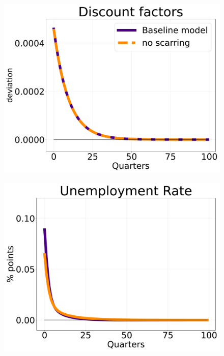 \begin{figure}[!h]
    \centering %
\begin{minipage}{0.33\textwidth}
  \includegraphics[scale=.14]{text/chapter1/Figures/IPRs_discfac/DiscFac_IPR}
  \label{fig:1}
\end{minipage}\hfil %
\begin{minipage}{0.33\textwidth}
  \includegraphics[scale=.14]{text/chapter1/Figures/IPRs_discfac/U_IPR}
  \label{fig:2}
\end{minipage}\hfil %
\begin{minipage}{0.33\textwidth}

\end{minipage}
\end{figure}
